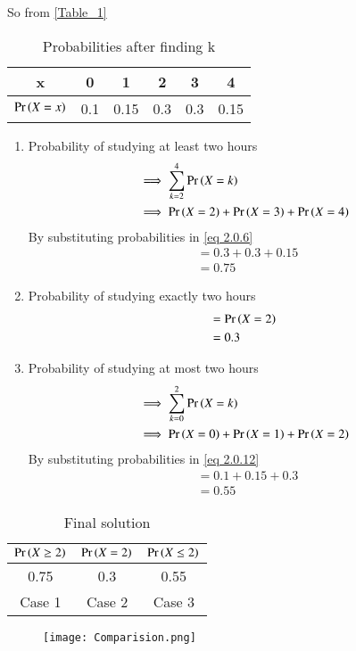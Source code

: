 \documentclass[journal,12pt,twocolumn]{IEEEtran}
\begin{document}
 So from \ref{Table_1}
  \begin{table}[ht]
  
  \centering
  \begin{tabular}{|c|c|c|c|c|c|}
    \hline
    x &  0 & 1 & 2 & 3 & 4\\
    \hline
    $\Pr\left(X=x\right)$ & 0.1& 0.15& 0.3 & 0.3 & 0.15\\
    \hline
    
\end{tabular} 
\caption{Probabilities after finding k}
\end{table}
\vspace{3mm}
    \begin{enumerate}
        \item Probability of studying at least two hours 
        \begin{align}
            & \implies \sum_{k = 2}^4 \Pr\left(X = k\right)\\
            & \implies \Pr\left(X = 2\right) +\Pr\left(X = 3\right) + \Pr\left(X = 4\right) \label{eq 2.0.6}
        \end{align}
        By substituting probabilities in \eqref{eq 2.0.6}
        \begin{align}
            & = 0.3 + 0.3 + 0.15\\
            & = 0.75
        \end{align}
        
        \item Probability of studying exactly two hours
        \begin{align}
            & = \Pr\left(X = 2\right)\\
            & = 0.3
        \end{align}
        
        \item Probability of studying at most two hours 
        \begin{align}
          & \implies \sum_{k = 0}^2  \Pr\left(X = k\right)\\
          & \implies \Pr\left(X = 0\right) + \Pr\left(X = 1\right) + \Pr\left(X = 2\right) \label{eq 2.0.12}
        \end{align}
        By substituting probabilities in \eqref{eq 2.0.12}
        \begin{align}
            & = 0.1 + 0.15 + 0.3\\
            & = 0.55
        \end{align}
    \end{enumerate}
  
    \begin{table}
   
    \centering
  \begin{tabular}{|c|c|c|}
    \hline
    $\Pr\left(X \geq 2\right)$ &  $\Pr \left(X = 2\right)$ & $\Pr\left(X \leq 2\right)$\\
    \hline
     0.75& 0.3& 0.55 \\
    \hline
    Case 1 &Case 2 &Case 3\\
    \hline
\end{tabular} 
 \caption{Final solution}
\end{table}

\begin{figure}
    \centering
    \texttt{[image: Comparision.png]}
    
\end{figure}
\end{document}
